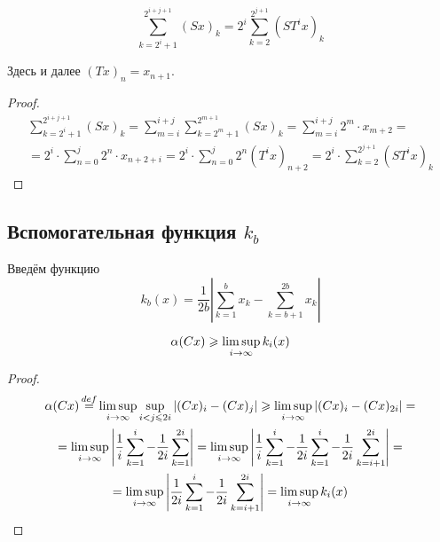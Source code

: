 \begin{lemma}
	\begin{equation}\label{summa_S}
		\sum_{k=2^i+1}^{2^{i+j+1}} (Sx)_k =
		2^i\sum_{k=2}^{2^{j+1}} (ST^ix)_k
	\end{equation}

	Здесь и далее $(Tx)_n = x_{n+1}$.
\end{lemma}

\begin{proof}
	\begin{multline*}
		\sum_{k=2^i+1}^{2^{i+j+1}} (Sx)_k =
		\sum_{m = i}^{i+j}\sum_{k=2^m+1}^{2^{m+1}} (Sx)_k =
		\sum_{m = i}^{i+j}2^m \cdot x_{m+2} =
		\\=
		2^i \cdot \sum_{n = 0}^{j}2^n \cdot x_{n+2+i} =
		2^i \cdot \sum_{n = 0}^{j}2^n (T^i x)_{n+2} =
		2^i \cdot \sum_{k=2}^{2^{j+1}} (ST^i x)_k
	\end{multline*}
\end{proof}

\subsection{Вспомогательная функция $k_b$}

Введём функцию
\begin{equation}\label{def_k_b}
	k_b(x) = \frac{1}{2b}\left|
		\sum_{k=1}^{b}x_k - \sum_{k=b+1}^{2b}x_k
	\right|
\end{equation}

\begin{lemma}
	\begin{equation}\label{alpha_greater_k_b}
		\alpha (Cx) \geq \varlimsup_{i\to \infty} k_i(x)
	\end{equation}
\end{lemma}

\begin{proof}
	\begin{multline*}
		\alpha (Cx) \mathop{=}\limits^{def}
		\varlimsup_{i\to \infty} \sup_{i<j\leq 2i} |(Cx)_i - (Cx)_j| \geq
		\varlimsup_{i\to \infty} |(Cx)_i - (Cx)_{2i}| =
		\\ =
		\varlimsup_{i\to \infty} \left|\frac{1}{i}\sum_{k=1}^i  - \frac{1}{2i}\sum_{k=1}^{2i} \right| =
		\varlimsup_{i\to \infty} \left|\frac{1}{i}\sum_{k=1}^i  - \frac{1}{2i}\sum_{k=1}^{i}- \frac{1}{2i}\sum_{k=i+1}^{2i}\right| =
		\\=
		\varlimsup_{i\to \infty} \left|\frac{1}{2i}\sum_{k=1}^i - \frac{1}{2i}\sum_{k=i+1}^{2i}\right| =
		\varlimsup_{i\to \infty} k_i(x)
	\end{multline*}
\end{proof}

